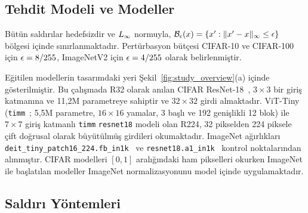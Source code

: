 \subsection{Tehdit Modeli ve Modeller}
\label{subsec:setup}

Bütün saldırılar hedefsizdir ve $L_\infty$ normuyla, $\mathcal{B}_\epsilon(x) = \{x' : \|x' - x\|_\infty \leq \epsilon\}$ bölgesi içinde sınırlanmaktadır. Pertürbasyon bütçesi CIFAR-10 ve CIFAR-100~\cite{krizhevsky2009learning} için $\epsilon = 8/255$, ImageNetV2 için $\epsilon = 4/255$ olarak belirlenmiştir.

Eğitilen modellerin tasarımdaki yeri Şekil~\ref{fig:study_overview}(a) içinde gösterilmiştir. Bu çalışmada R32 olarak anılan CIFAR ResNet-18~\cite{he2016deep}, $3\times3$ bir giriş katmanına ve 11{,}2M parametreye sahiptir ve $32\times32$ girdi almaktadır. ViT-Tiny (\texttt{timm}~\cite{rw2019timm}; 5{,}5M parametre, $16\times16$ yamalar, 3 başlı ve 192 genişlikli 12 blok) ile $7\times7$ giriş katmanlı \texttt{timm} \texttt{resnet18} modeli olan R224, 32 pikselden 224 piksele çift doğrusal olarak büyütülmüş girdileri okumaktadır. ImageNet ağırlıkları \texttt{deit\_tiny\_patch16\_224.fb\_in1k}~\cite{touvron2021training} ve \texttt{resnet18.a1\_in1k}~\cite{wightman2021resnet} kontrol noktalarından alınmıştır. CIFAR modelleri $[0,1]$ aralığındaki ham pikselleri okurken ImageNet ile başlatılan modeller ImageNet normalizasyonunu model içinde uygulamaktadır.

\subsection{Saldırı Yöntemleri}
\label{subsec:attack_methods}

